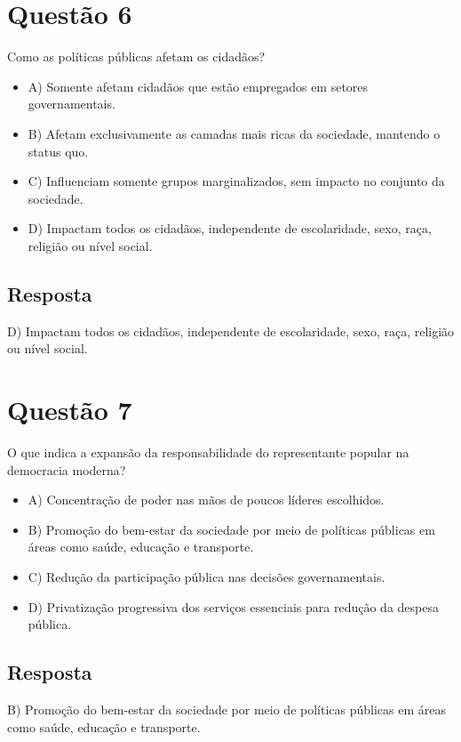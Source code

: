 \documentclass[
   article,       
   12pt,          
   oneside,       
   a4paper,       
   english,       
   brazil,        
   sumario=tradicional
   ]{abntex2}
\begin{document}
\section{Questão 6}
Como as políticas públicas afetam os cidadãos?
\begin{itemize}
    \item {A) Somente afetam cidadãos que estão empregados em setores governamentais.}
    \item {B) Afetam exclusivamente as camadas mais ricas da sociedade, mantendo o status quo.}
    \item {C) Influenciam somente grupos marginalizados, sem impacto no conjunto da sociedade.}
    \item {D) Impactam todos os cidadãos, independente de escolaridade, sexo, raça, religião ou nível social.}
\end{itemize}

\subsection{Resposta}
D) Impactam todos os cidadãos, independente de escolaridade, sexo, raça, religião ou nível social.

\section{Questão 7}
O que indica a expansão da responsabilidade do representante popular na democracia moderna?
\begin{itemize}
    \item {A) Concentração de poder nas mãos de poucos líderes escolhidos.}
    \item {B) Promoção do bem-estar da sociedade por meio de políticas públicas em áreas como saúde, educação e transporte.}
    \item {C) Redução da participação pública nas decisões governamentais.}
    \item {D) Privatização progressiva dos serviços essenciais para redução da despesa pública.}
\end{itemize}

\subsection{Resposta}
B) Promoção do bem-estar da sociedade por meio de políticas públicas em áreas como saúde, educação e transporte.
\end{document}
